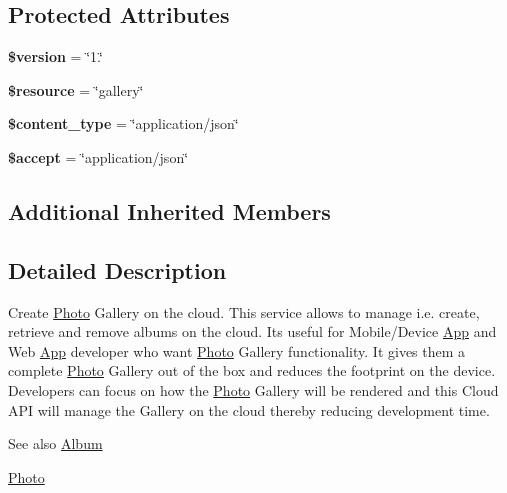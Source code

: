 \subsection*{Protected Attributes}
\begin{DoxyCompactItemize}
\item 
\hypertarget{class_album_service_a17c8948c68aa44fa9961ae169b6a8961}{{\bfseries \$version} = \char`\"{}1.\char`\"{}}\label{class_album_service_a17c8948c68aa44fa9961ae169b6a8961}

\item 
\hypertarget{class_album_service_abd4c7b8b084214b8d2533ba07fce6b83}{{\bfseries \$resource} = \char`\"{}gallery\char`\"{}}\label{class_album_service_abd4c7b8b084214b8d2533ba07fce6b83}

\item 
\hypertarget{class_album_service_ae754d6373f275e781f47c8bc9b994b6d}{{\bfseries \$content\+\_\+type} = \char`\"{}application/json\char`\"{}}\label{class_album_service_ae754d6373f275e781f47c8bc9b994b6d}

\item 
\hypertarget{class_album_service_a75fc18c4ff06288ff9fdf8aba9bd1081}{{\bfseries \$accept} = \char`\"{}application/json\char`\"{}}\label{class_album_service_a75fc18c4ff06288ff9fdf8aba9bd1081}

\end{DoxyCompactItemize}
\subsection*{Additional Inherited Members}


\subsection{Detailed Description}
Create \hyperlink{class_photo}{Photo} Gallery on the cloud. This service allows to manage i.\+e. create, retrieve and remove albums on the cloud. Its useful for Mobile/\+Device \hyperlink{class_app}{App} and Web \hyperlink{class_app}{App} developer who want \hyperlink{class_photo}{Photo} Gallery functionality. It gives them a complete \hyperlink{class_photo}{Photo} Gallery out of the box and reduces the footprint on the device. Developers can focus on how the \hyperlink{class_photo}{Photo} Gallery will be rendered and this Cloud A\+P\+I will manage the Gallery on the cloud thereby reducing development time.

\begin{DoxySeeAlso}{See also}
\hyperlink{class_album}{Album} 

\hyperlink{class_photo}{Photo} 
\end{DoxySeeAlso}


